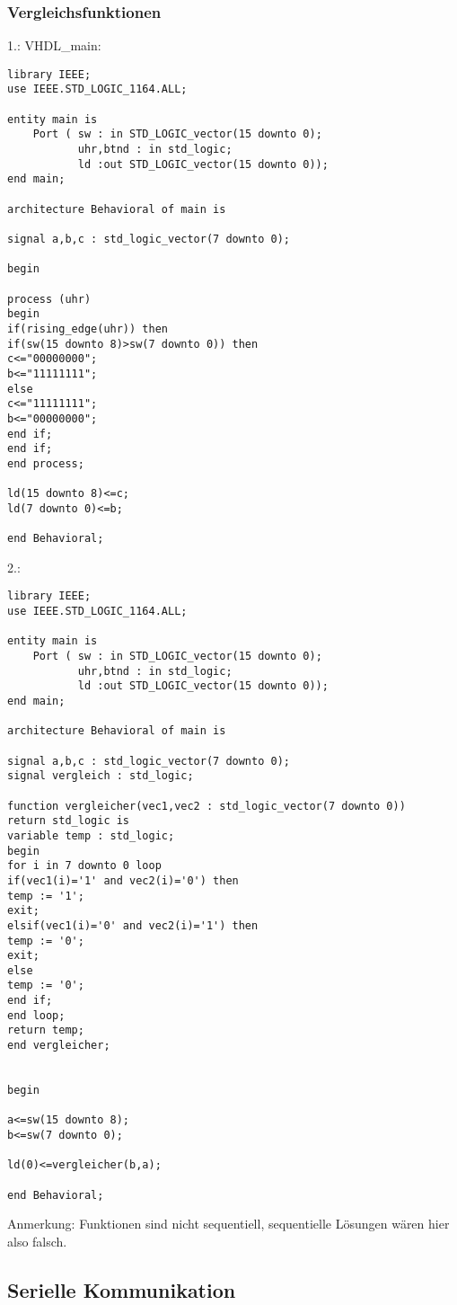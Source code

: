 \documentclass{article}
\begin{document}
\subsubsection{Vergleichsfunktionen}
1.:\newline
VHDL\_main:\newline
\begin{verbatim}
library IEEE;
use IEEE.STD_LOGIC_1164.ALL;

entity main is
    Port ( sw : in STD_LOGIC_vector(15 downto 0);
           uhr,btnd : in std_logic;
           ld :out STD_LOGIC_vector(15 downto 0));
end main;

architecture Behavioral of main is

signal a,b,c : std_logic_vector(7 downto 0);

begin

process (uhr)
begin
if(rising_edge(uhr)) then
if(sw(15 downto 8)>sw(7 downto 0)) then
c<="00000000";
b<="11111111";
else
c<="11111111";
b<="00000000";
end if;
end if;
end process;

ld(15 downto 8)<=c;
ld(7 downto 0)<=b;

end Behavioral;
\end{verbatim}
2.:\newline
\begin{verbatim}
library IEEE;
use IEEE.STD_LOGIC_1164.ALL;

entity main is
    Port ( sw : in STD_LOGIC_vector(15 downto 0);
           uhr,btnd : in std_logic;
           ld :out STD_LOGIC_vector(15 downto 0));
end main;

architecture Behavioral of main is

signal a,b,c : std_logic_vector(7 downto 0);
signal vergleich : std_logic;

function vergleicher(vec1,vec2 : std_logic_vector(7 downto 0))
return std_logic is
variable temp : std_logic;
begin
for i in 7 downto 0 loop
if(vec1(i)='1' and vec2(i)='0') then
temp := '1';
exit;
elsif(vec1(i)='0' and vec2(i)='1') then
temp := '0';
exit;
else
temp := '0';
end if;
end loop;
return temp;
end vergleicher;


begin

a<=sw(15 downto 8);
b<=sw(7 downto 0);

ld(0)<=vergleicher(b,a);

end Behavioral;
\end{verbatim}
Anmerkung: Funktionen sind nicht sequentiell, sequentielle L\"osungen w\"aren hier also falsch.

\subsection{Serielle Kommunikation}
\end{document}

